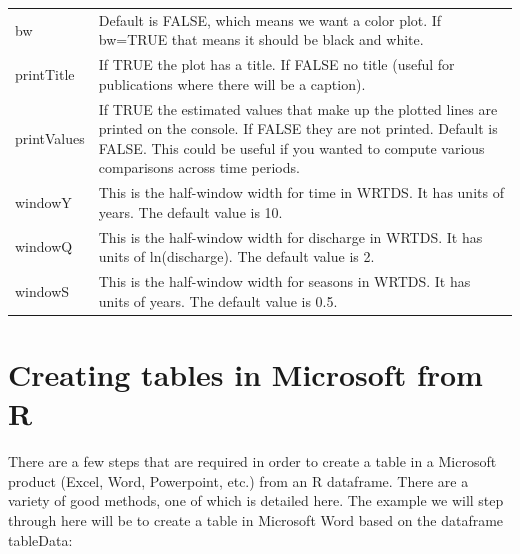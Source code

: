 \documentclass[a4paper,11pt]{article}
\begin{document}
\begin{table}[ht]
\begin{tabularx}{\textwidth}{lX}
bw & Default is FALSE, which means we want a color plot.  If bw=TRUE that means it should be black and white.\\
printTitle & If TRUE the plot has a title.  If FALSE no title (useful for publications where there will be a caption).\\
printValues & If TRUE the estimated values that make up the plotted lines are printed on the console.  If FALSE they are not printed.  Default is FALSE.  This could be useful if you wanted to compute various comparisons across time periods.\\
windowY & This is the half-window width for time in WRTDS.  It has units of years.  The default value is 10. \\
windowQ & This is the half-window width for discharge in WRTDS.  It has units of ln(discharge).  The default value is 2. \\
windowS & This is the half-window width for seasons in WRTDS.  It has units of years.  The default value is 0.5. \\
\hline
\end{tabularx}

\end{table}

\FloatBarrier

\section{Creating tables in Microsoft from R}
\label{app:createWordTable}
There are a few steps that are required in order to create a table in a Microsoft product (Excel, Word, Powerpoint, etc.) from an R dataframe. There are a variety of good methods, one of which is detailed here. The example we will step through here will be to create a table in Microsoft Word based on the dataframe tableData:

\begin{Schunk}
\end{Schunk}
\end{document}
